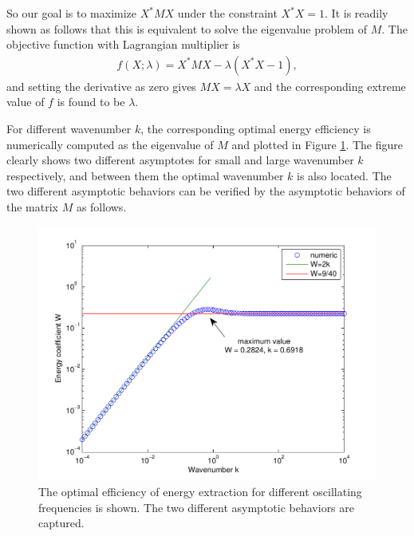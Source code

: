 So our goal is to maximize $X^* M X$ under the constraint $X^* X = 1$.
It is readily shown as follows that this is equivalent to solve the eigenvalue problem of $M$.
The objective function with Lagrangian multiplier is 
\begin{align}
f(X; \lambda) = X^* M X - \lambda (X^* X - 1),
\end{align}
and setting the derivative as zero gives $MX = \lambda X$ and the corresponding extreme value of $f$ is found to be $\lambda$.

For different wavenumber $k$, the corresponding optimal energy efficiency is numerically computed as the eigenvalue of $M$ and plotted in Figure \ref{fig:Theodorsen}.
The figure clearly shows two different asymptotes for small and large wavenumber $k$ respectively, and between them the optimal wavenumber $k$ is also located.
The two different asymptotic behaviors can be verified by the asymptotic behaviors of the matrix $M$ as follows. 

\begin{figure}
\begin{center}
\includegraphics[width=12cm]{Figures/TheodorsenEnergy.pdf}
\end{center}
\caption[The optimal energy efficiency for different oscillating frequencies of plate]{The optimal efficiency of energy extraction for different oscillating frequencies is shown. The two different asymptotic behaviors are captured.}
\label{fig:Theodorsen}
\end{figure}


